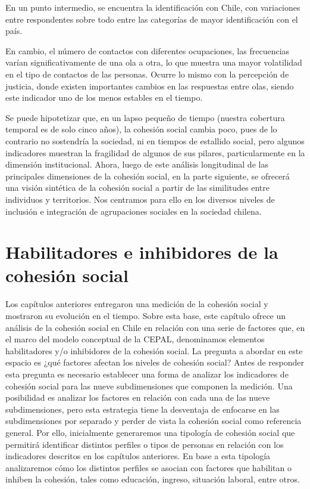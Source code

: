 \documentclass[
  12pt,
]{book}
\begin{document}
En un punto intermedio, se encuentra la identificación con Chile, con variaciones entre respondentes sobre todo entre las categorías de mayor identificación con el país.

En cambio, el número de contactos con diferentes ocupaciones, las frecuencias varían significativamente de una ola a otra, lo que muestra una mayor volatilidad en el tipo de contactos de las personas. Ocurre lo mismo con la percepción de justicia, donde existen importantes cambios en las respuestas entre olas, siendo este indicador uno de los menos estables en el tiempo.

Se puede hipotetizar que, en un lapso pequeño de tiempo (nuestra cobertura temporal es de solo cinco años), la cohesión social cambia poco, pues de lo contrario no sostendría la sociedad, ni en tiempos de estallido social, pero algunos indicadores muestran la fragilidad de algunos de sus pilares, particularmente en la dimensión institucional. Ahora, luego de este análisis longitudinal de las principales dimensiones de la cohesión social, en la parte siguiente, se ofrecerá una visión sintética de la cohesión social a partir de las similitudes entre individuos y territorios. Nos centramos para ello en los diversos niveles de inclusión e integración de agrupaciones sociales en la sociedad chilena.

\hypertarget{habilitadores-e-inhibidores-de-la-cohesiuxf3n-social}{%
\chapter{Habilitadores e inhibidores de la cohesión social}\label{habilitadores-e-inhibidores-de-la-cohesiuxf3n-social}}

Los capítulos anteriores entregaron una medición de la cohesión social y mostraron su evolución en el tiempo. Sobre esta base, este capítulo ofrece un análisis de la cohesión social en Chile en relación con una serie de factores que, en el marco del modelo conceptual de la CEPAL, denominamos elementos habilitadores y/o inhibidores de la cohesión social. La pregunta a abordar en este espacio es ¿qué factores afectan los niveles de cohesión social? Antes de responder esta pregunta es necesario establecer una forma de analizar los indicadores de cohesión social para las nueve subdimensiones que componen la medición. Una posibilidad es analizar los factores en relación con cada una de las nueve subdimensiones, pero esta estrategia tiene la desventaja de enfocarse en las subdimensiones por separado y perder de vista la cohesión social como referencia general. Por ello, inicialmente generaremos una tipología de cohesión social que permitirá identificar distintos perfiles o tipos de personas en relación con los indicadores descritos en los capítulos anteriores. En base a esta tipología analizaremos cómo los distintos perfiles se asocian con factores que habilitan o inhiben la cohesión, tales como educación, ingreso, situación laboral, entre otros.
\end{document}
